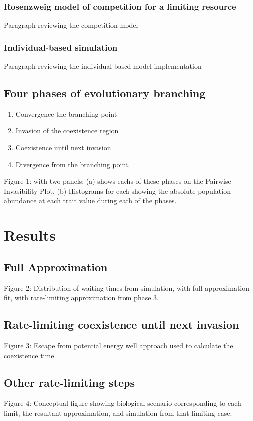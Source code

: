 \documentclass[authoryear,1p,10pt]{elsarticle}
\begin{document}
\subsubsection{Rosenzweig model of competition for a limiting resource}
Paragraph reviewing the competition model
\subsubsection{Individual-based simulation}
Paragraph reviewing the individual based model implementation
\subsection{Four phases of evolutionary branching}
\begin{enumerate}
\item Convergence the branching point
\item Invasion of the coexistence region
\item Coexistence until next invasion
\item Divergence from the branching point.
\end{enumerate}
Figure 1: with two panels:  (a) shows eachs of these phases on the Pairwise Invasibility Plot. (b) Histograms for each showing the absolute population abundance at each trait value during each of the phases.   

\section{Results}
\subsection{Full Approximation}
Figure 2: Distribution of waiting times from simulation, with full approximation fit, with rate-limiting approximation from phase 3.
\subsection{Rate-limiting coexistence until next invasion}
Figure 3: Escape from potential energy well approach used to calculate the coexistence time
\subsection{Other rate-limiting steps}
Figure 4: Conceptual figure showing biological scenario corresponding to each limit, the resultant approximation, and simulation from that limiting case.
\end{document}
